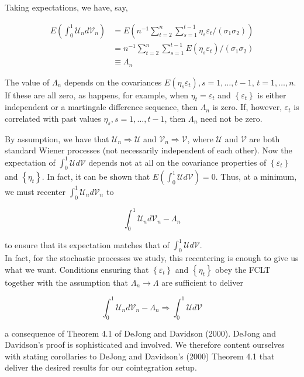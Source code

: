 \documentclass[10pt]{article}
\begin{document}
Taking expectations, we have, say,

$$
\begin{aligned}
E\left(\int_{0}^{1} \mathcal{U}_{n} d \mathcal{V}_{n}\right) & =E\left(n^{-1} \sum_{t=2}^{n} \sum_{s=1}^{t-1} \eta_{s} \varepsilon_{t} /\left(\sigma_{1} \sigma_{2}\right)\right) \\
& =n^{-1} \sum_{t=2}^{n} \sum_{s=1}^{t-1} E\left(\eta_{s} \varepsilon_{t}\right) /\left(\sigma_{1} \sigma_{2}\right) \\
& \equiv \Lambda_{n}
\end{aligned}
$$

The value of $\Lambda_{n}$ depends on the covariances $E\left(\eta_{s} \varepsilon_{t}\right), s=1, \ldots, t-1$, $t=1, \ldots, n$. If these are all zero, as happens, for example, when $\eta_{t}=\varepsilon_{t}$ and $\left\{\varepsilon_{t}\right\}$ is either independent or a martingale difference sequence, then $\Lambda_{n}$ is zero. If, however, $\varepsilon_{t}$ is correlated with past values $\eta_{s}, s=1, \ldots, t-1$, then $\Lambda_{n}$ need not be zero.

By assumption, we have that $\mathcal{U}_{n} \Rightarrow \mathcal{U}$ and $\mathcal{V}_{n} \Rightarrow \mathcal{V}$, where $\mathcal{U}$ and $\mathcal{V}$ are both standard Wiener processes (not necessarily independent of each other). Now the expectation of $\int_{0}^{1} \mathcal{U} d \mathcal{V}$ depends not at all on the covariance properties of $\left\{\varepsilon_{t}\right\}$ and $\left\{\eta_{t}\right\}$. In fact, it can be shown that $E\left(\int_{0}^{1} \mathcal{U} d \mathcal{V}\right)=0$. Thus, at a minimum, we must recenter $\int_{0}^{1} \mathcal{U}_{n} d \mathcal{V}_{n}$ to

$$
\int_{0}^{1} \mathcal{U}_{n} d \mathcal{V}_{n}-\Lambda_{n}
$$

to ensure that its expectation matches that of $\int_{0}^{1} \mathcal{U} d \mathcal{V}$.\\
In fact, for the stochastic processes we study, this recentering is enough to give us what we want. Conditions ensuring that $\left\{\varepsilon_{t}\right\}$ and $\left\{\eta_{t}\right\}$ obey the FCLT together with the assumption that $\Lambda_{n} \rightarrow \Lambda$ are sufficient to deliver

$$
\int_{0}^{1} \mathcal{U}_{n} d \mathcal{V}_{n}-\Lambda_{n} \Rightarrow \int_{0}^{1} \mathcal{U} d \mathcal{V}
$$

a consequence of Theorem 4.1 of DeJong and Davidson (2000). DeJong and Davidson's proof is sophisticated and involved. We therefore content ourselves with stating corollaries to DeJong and Davidson's (2000) Theorem 4.1 that deliver the desired results for our cointegration setup.
\end{document}

